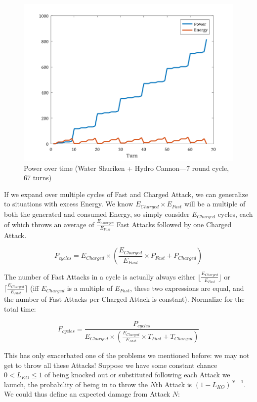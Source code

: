 \begin{figure}[ht]
  \centering
  \includegraphics[width=\textwidth]{octave/greninja.png}
  \caption[Power over time]{Power over time (Water Shuriken + Hydro Cannon---7 round cycle, 67 turns)}
\end{figure}

If we expand over multiple cycles of Fast and Charged Attack, we can
 generalize to situations with excess Energy. We know $E_{Charged} \times
 E_{Fast}$ will be a multiple of both the generated and consumed Energy, so
 simply consider $E_{Charged}$ cycles, each of which throws an average of
 $\frac{E_{Charged}}{E_{Fast}}$ Fast Attacks followed by one Charged Attack.

\[ P_{cycles} = E_{Charged} \times \left(\frac{E_{Charged}}{E_{Fast}} \times P_{Fast} + P_{Charged}\right) \]

 The number of Fast Attacks in a cycle is actually always either
 $\lfloor\frac{E_{Charged}}{E_{Fast}}\rfloor$
 or $\lceil\frac{E_{Charged}}{E_{Fast}}\rceil$ (iff $E_{Charged}$ is a multiple of
 $E_{Fast}$, these two expressions are equal, and the number of Fast Attacks
 per Charged Attack is constant). Normalize for the total time:

\[ F_{cycles} = \frac{P_{cycles}}{E_{Charged} \times \left(\frac{E_{Charged}}{E_{Fast}} \times T_{Fast} + T_{Charged}\right)} \]

This has only exacerbated one of the problems we mentioned before: we may
  not get to throw all these Attacks!
Suppose we have some constant chance $0 < L_{KO} \leq 1$ of being knocked out or
 substituted following each Attack we launch, the probability of being
 in to throw the $N$th Attack is $(1 - L_{KO})^{N-1}$.
We could thus define an expected damage from Attack $N$:

